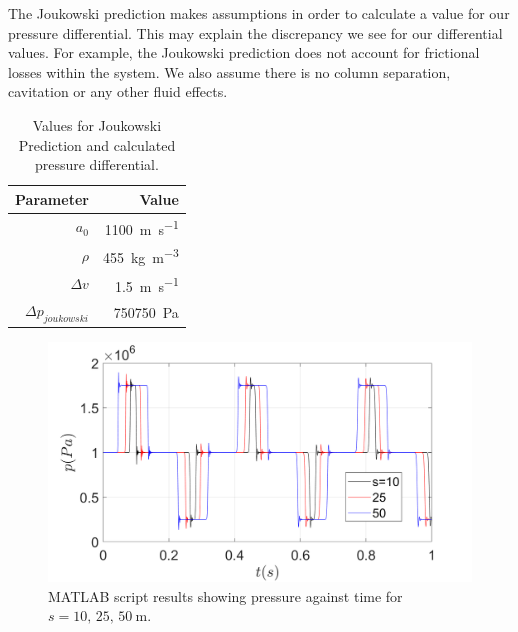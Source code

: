 The Joukowski prediction makes assumptions in order to calculate a value for our pressure differential. This may explain the discrepancy we see for our differential values. For example, the Joukowski prediction does not account for frictional losses within the system. We also assume there is no column separation, cavitation or any other fluid effects.

\begin{table}[H]
    \centering
    \begin{tabular}{@{}rr@{}}
        \toprule
        \textbf{Parameter}     & \textbf{Value}                       \\
        \midrule
        $a_0$                  & \SI{1100}{\meter\per\second}         \\
        $\rho$                 & \SI{455}{\kilo\gram\per\meter\cubed} \\
        $\Delta v$             & \SI{1.5}{\meter\per\second}          \\
        $\Delta p_{joukowski}$ & \SI{750750}{\pascal}                 \\
        \bottomrule
    \end{tabular}
    \caption{Values for Joukowski Prediction and calculated pressure differential.}
    \label{matlabScriptVals}
\end{table}

\begin{figure}[H]
    \centering
    \includegraphics[width = 0.9 \textwidth]{img/fig1.png}
    \caption{MATLAB script results showing pressure against time for $s=10,\,25,\,\SI{50}{\meter}$.}
    \label{pressure1}
\end{figure}

